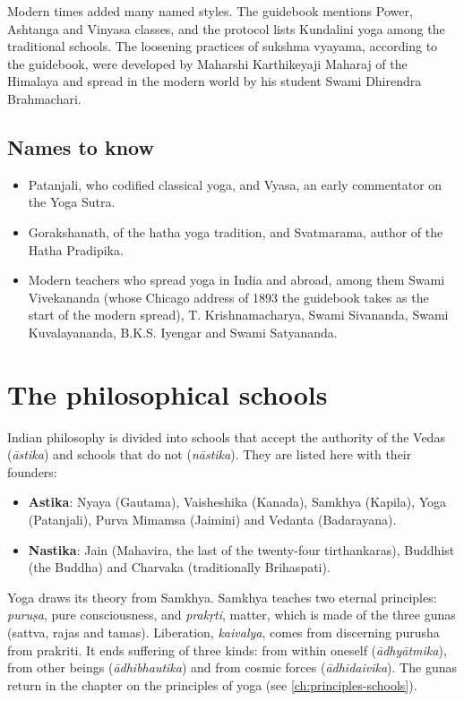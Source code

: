 Modern times added many named styles. The guidebook mentions Power, Ashtanga and Vinyasa classes, and the protocol lists Kundalini yoga among the traditional schools. The loosening practices of sukshma vyayama, according to the guidebook, were developed by Maharshi Karthikeyaji Maharaj of the Himalaya and spread in the modern world by his student Swami Dhirendra Brahmachari.

\subsection*{Names to know}
\begin{itemize}
\item Patanjali, who codified classical yoga, and Vyasa, an early commentator on the Yoga Sutra.
\item Gorakshanath, of the hatha yoga tradition, and Svatmarama, author of the Hatha Pradipika.
\item Modern teachers who spread yoga in India and abroad, among them Swami Vivekananda (whose Chicago address of 1893 the guidebook takes as the start of the modern spread), T. Krishnamacharya, Swami Sivananda, Swami Kuvalayananda, B.K.S. Iyengar and Swami Satyananda.
\end{itemize}


\section{The philosophical schools}

Indian philosophy is divided into schools that accept the authority of the Vedas (\emph{āstika}) and schools that do not (\emph{nāstika}). They are listed here with their founders:
\begin{itemize}
\item \textbf{Astika}: Nyaya (Gautama), Vaisheshika (Kanada), Samkhya (Kapila), Yoga (Patanjali), Purva Mimamsa (Jaimini) and Vedanta (Badarayana).
\item \textbf{Nastika}: Jain (Mahavira, the last of the twenty-four tirthankaras), Buddhist (the Buddha) and Charvaka (traditionally Brihaspati).
\end{itemize}

Yoga draws its theory from Samkhya. Samkhya teaches two eternal principles: \emph{puruṣa}, pure consciousness, and \emph{prakṛti}, matter, which is made of the three gunas (sattva, rajas and tamas). Liberation, \emph{kaivalya}, comes from discerning purusha from prakriti. It ends suffering of three kinds: from within oneself (\emph{ādhyātmika}), from other beings (\emph{ādhibhautika}) and from cosmic forces (\emph{ādhidaivika}). The gunas return in the chapter on the principles of yoga (see \cref{ch:principles-schools}).

